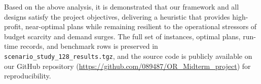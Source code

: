 \documentclass[10pt,a4paper]{article}
\begin{document}
Based on the above analysis, it is demonstrated that our framework and all designs satisfy the project objectives, delivering a heuristic that provides high-profit, near-optimal plans while remaining resilient to the operational stressors of budget scarcity and demand surges. The full set of instances, optimal plans, run-time records, and benchmark rows is preserved in \texttt{scenario\_study\_128\_results.tgz}, and the source code is publicly available on our GitHub repository (\url{https://github.com/089487/OR_Midterm_project}) for reproducibility.
\end{document}
